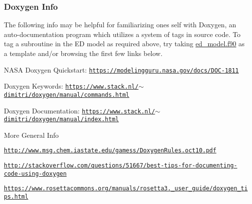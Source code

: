 \subsubsection*{\label{_doxyinfo}%
 Doxygen Info }

The following info may be helpful for familiarizing one\textquotesingle{}s self with Doxygen, an auto-\/documentation program which utilizes a system of tags in source code. To tag a subroutine in the ED model as required above, try taking \hyperlink{ed__model_8_f90}{ed\+\_\+model.\+f90} as a template and/or browsing the first few links below.
\begin{DoxyItemize}
\item N\+A\+SA Doxygen Quickstart\+: \href{https://modelingguru.nasa.gov/docs/DOC-1811}{\tt https\+://modelingguru.\+nasa.\+gov/docs/\+D\+O\+C-\/1811}
\item Doxygen Keywords\+: \href{https://www.stack.nl/~dimitri/doxygen/manual/commands.html}{\tt https\+://www.\+stack.\+nl/$\sim$dimitri/doxygen/manual/commands.\+html}
\item Doxygen Documentation\+: \href{https://www.stack.nl/~dimitri/doxygen/manual/index.html}{\tt https\+://www.\+stack.\+nl/$\sim$dimitri/doxygen/manual/index.\+html}
\end{DoxyItemize}

More General Info
\begin{DoxyItemize}
\item \href{http://www.msg.chem.iastate.edu/gamess/DoxygenRules.oct10.pdf}{\tt http\+://www.\+msg.\+chem.\+iastate.\+edu/gamess/\+Doxygen\+Rules.\+oct10.\+pdf}
\item \href{http://stackoverflow.com/questions/51667/best-tips-for-documenting-code-using-doxygen}{\tt http\+://stackoverflow.\+com/questions/51667/best-\/tips-\/for-\/documenting-\/code-\/using-\/doxygen}
\item \href{https://www.rosettacommons.org/manuals/rosetta3.2_user_guide/doxygen_tips.html}{\tt https\+://www.\+rosettacommons.\+org/manuals/rosetta3.\+\_\+user\+\_\+guide/doxygen\+\_\+tips.\+html}
\end{DoxyItemize}


